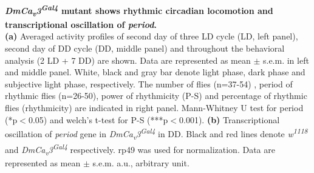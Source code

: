 \label{fig:4}
\textbf{ \emph{DmCa\textsubscript{v}3\textsuperscript{Gal4}} mutant shows rhythmic circadian locomotion and transcriptional oscillation of \emph{period}.}
\\
\textbf{(a)} Averaged activity profiles of second day of three LD cycle (LD, left panel), second day of DD cycle (DD, middle panel) and throughout the behavioral analysis (2 LD + 7 DD) are shown.
Data are represented as mean $\pm$ s.e.m. in left and middle panel.
White, black and gray bar denote light phase, dark phase and subjective light phase, respectively.
The number of flies (n=37-54) , period of rhythmic flies (n=26-50), power of rhythmicity (P-S) and percentage of rhythmic flies (rhythmicity) are indicated in right panel.
Mann-Whitney U test for period (*p$<$0.05) and welch's t-test for P-S (***p$<$0.001). 
\textbf{(b)} Transcriptional oscillation of \emph{period} gene in  \emph{DmCa\textsubscript{v}3\textsuperscript{Gal4}} in DD. Black and red lines denote \emph{w\textsuperscript{1118}} and \emph{DmCa\textsubscript{v}3\textsuperscript{Gal4}} respectively. rp49 was used for normalization.
Data are represented as mean $\pm$ s.e.m.
a.u., arbitrary unit.
  
  
  
  
  
  
  